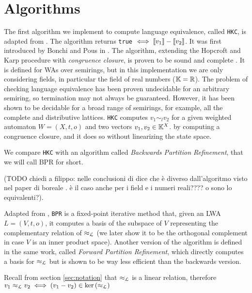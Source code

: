 \section{Algorithms}
The first algorithm we implement to compute language equivalence, called \texttt{HKC},
is adapted from \cite{DBLP:journals/corr/Bonchi0K17}. 
The algorithm returns \texttt{true} $\iff \llbracket v_1\rrbracket - \llbracket v_2\rrbracket$.
It was first introduced by 
Bonchi and Pous in \cite{bonchi2013checking}.
The algorithm, extending the Hopcroft and Karp procedure 
\cite{hopcroft1971linear} with \textit{congruence closure}, is 
proven to be sound and complete \cite{DBLP:journals/corr/Bonchi0K17}.
It is defined for 
WAs over semirings, but in this implementation we are only 
considering fields, in particular 
the field of real numbers ($\mathbb{K} = \mathbb{R}$).
The problem of checking language equivalence 
has been proven undecidable for an arbitrary semiring, so termination 
may not always be guaranteed. However, it has been shown to be decidable
for a broad range of semirings, for example, all the complete and
distributive lattices.
\texttt{HKC} computes $v_1 \sim_l v_2$ for a given weighted automaton
$W = (X, t, o)$ and two vectors $v_1, v_2 \in \mathbb{K}^X$. 
by computing a congruence closure,
and it does so without linearizing the state space. 

We compare \texttt{HKC} with an algorithm called 
\textit{Backwards Partition Refinement}, that we will call BPR for short. 

(TODO chiedi a filippo: nelle conclusioni di \cite{BONCHI201277} dice che è diverso 
dall'algoritmo visto nel paper di boreale \cite{boreale2009weighted}. è il caso 
anche per i field e i numeri reali???? o sono lo equivalenti?).

Adapted from \cite{BONCHI201277}, 
\texttt{BPR} is a fixed-point iterative method that, given an LWA
$L = (V, t, o)$,
it computes a basis of the subspace of $V$
representing the complementary relation of $\approx_{\mathcal{L}}$ (we later show it to be the 
orthogonal complement in case $V$ is an inner product space). 
Another version of the algorithm is defined in the same work,
called \textit{Forward Partition Refinement}, which directly computes
a basis for $\approx_{\mathcal{L}}$
but is shown to be way less efficient than the backwards version.


\begin{note}
    Recall from section \ref{sec:notation} that $\approx_{\mathcal{L}}$ is a linear relation, 
    therefore $v_1 \approx_{\mathcal{L}} v_2 \iff (v_1 - v_2) \in \text{ker}\left(\approx_{\mathcal{L}}\right)$
\end{note}



